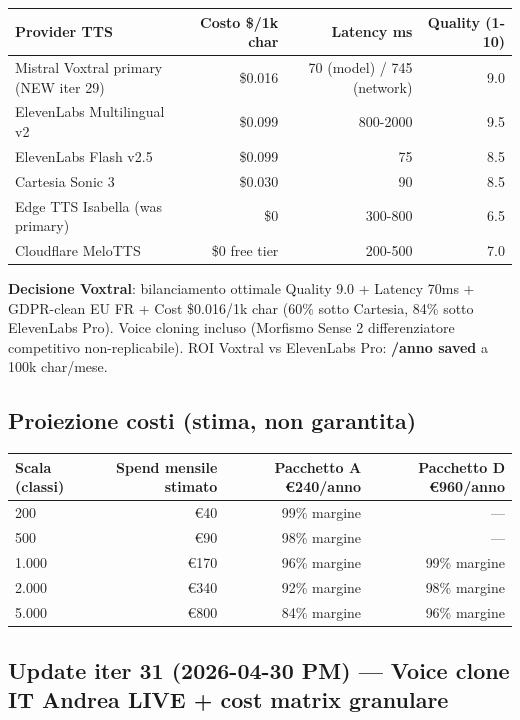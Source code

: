 \documentclass[12pt,a4paper]{article}
\begin{document}
\begin{center}
\begin{tabular}{lrrr}
\toprule
\textbf{Provider TTS} & \textbf{Costo \$/1k char} & \textbf{Latency ms} & \textbf{Quality (1-10)} \\
\midrule
Mistral Voxtral primary (NEW iter 29) & \$0.016 & 70 (model) / 745 (network) & 9.0 \\
ElevenLabs Multilingual v2 & \$0.099 & 800-2000 & 9.5 \\
ElevenLabs Flash v2.5 & \$0.099 & 75 & 8.5 \\
Cartesia Sonic 3 & \$0.030 & 90 & 8.5 \\
Edge TTS Isabella (was primary) & \$0 & 300-800 & 6.5 \\
Cloudflare MeloTTS & \$0 free tier & 200-500 & 7.0 \\
\bottomrule
\end{tabular}
\end{center}

\textbf{Decisione Voxtral}: bilanciamento ottimale Quality 9.0 + Latency 70ms + GDPR-clean EU FR + Cost \$0.016/1k char (60\% sotto Cartesia, 84\% sotto ElevenLabs Pro). Voice cloning incluso (Morfismo Sense 2 differenziatore competitivo non-replicabile). ROI Voxtral vs ElevenLabs Pro: \textbf{/anno saved} a 100k char/mese.

\subsection*{Proiezione costi (stima, non garantita)}

\begin{center}
\begin{tabular}{lrrr}
\toprule
\textbf{Scala (classi)} & \textbf{Spend mensile stimato} & \textbf{Pacchetto A €240/anno} & \textbf{Pacchetto D €960/anno} \\
\midrule
200    & ~€40   & 99\% margine & --- \\
500    & ~€90   & 98\% margine & --- \\
1.000  & ~€170  & 96\% margine & 99\% margine \\
2.000  & ~€340  & 92\% margine & 98\% margine \\
5.000  & ~€800  & 84\% margine & 96\% margine \\
\bottomrule
\end{tabular}
\end{center}

\subsection*{Update iter 31 (2026-04-30 PM) — Voice clone IT Andrea LIVE + cost matrix granulare}
\end{document}
